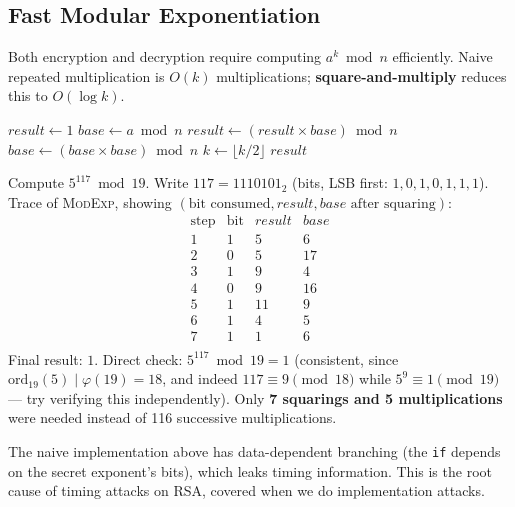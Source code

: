 \subsection{Fast Modular Exponentiation}
Both encryption and decryption require computing $a^{k} \bmod n$ efficiently. Naive repeated multiplication is $O(k)$ multiplications; \textbf{square-and-multiply} reduces this to $O(\log k)$.

\begin{algorithm}[h]
\caption{Square-and-Multiply (Right-to-Left)}
\begin{algorithmic}[1]
    \State $result \gets 1$
    \State $base \gets a \bmod n$
            \State $result \gets (result \times base) \bmod n$
        \EndIf
        \State $base \gets (base \times base) \bmod n$
        \State $k \gets \lfloor k / 2 \rfloor$
    \EndWhile
    \State \Return $result$
\EndFunction
\end{algorithmic}
\end{algorithm}

\begin{example}
Compute $5^{117} \bmod 19$. Write $117 = 1110101_2$ (bits, LSB first: $1,0,1,0,1,1,1$). Trace of \textsc{ModExp}, showing $(\text{bit consumed}, result, base \text{ after squaring})$:
\[
\begin{array}{c|ccc}
\text{step} & \text{bit} & result & base \\
\hline
1 & 1 & 5 & 6 \\
2 & 0 & 5 & 17 \\
3 & 1 & 9 & 4 \\
4 & 0 & 9 & 16 \\
5 & 1 & 11 & 9 \\
6 & 1 & 4 & 5 \\
7 & 1 & 1 & 6 \\
\end{array}
\]
Final result: $1$. Direct check: $5^{117} \bmod 19 = 1$ (consistent, since $\mathrm{ord}_{19}(5) \mid \varphi(19) = 18$, and indeed $117 \equiv 9 \pmod{18}$ while $5^9 \equiv 1 \pmod{19}$ — try verifying this independently). Only \textbf{7 squarings and 5 multiplications} were needed instead of 116 successive multiplications.
\end{example}

\begin{remark}
The naive implementation above has data-dependent branching (the \texttt{if} depends on the secret exponent's bits), which leaks timing information. This is the root cause of timing attacks on RSA, covered when we do implementation attacks.
\end{remark}

